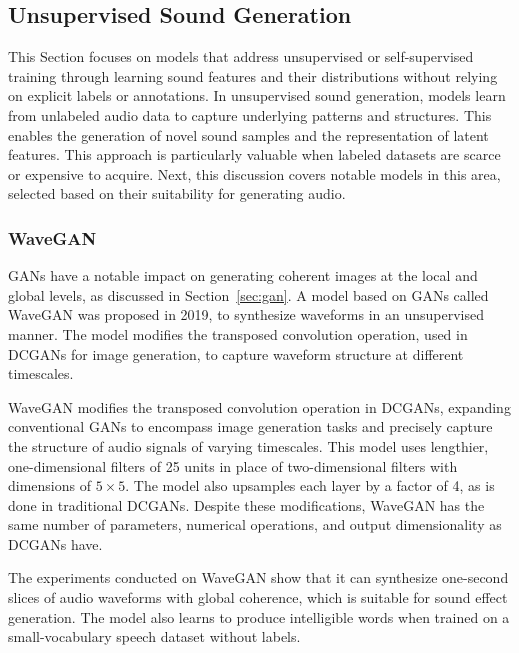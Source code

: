 \subsection{Unsupervised Sound Generation} \label{sec:unsupervised-generation}

This Section focuses on models that address unsupervised or self-supervised training through learning sound features and their distributions without relying on explicit labels or annotations. In unsupervised sound generation, models learn from unlabeled audio data to capture underlying patterns and structures. This enables the generation of novel sound samples and the representation of latent features. This approach is particularly valuable when labeled datasets are scarce or expensive to acquire. Next, this discussion covers notable models in this area, selected based on their suitability for generating audio.

\subsubsection{WaveGAN} \label{sec:wavegan}

\Acp{GAN} have a notable impact on generating coherent images at the local and global levels, as discussed in Section~\ref{sec:gan}. A model based on \acp{GAN} called WaveGAN \cite{donahue_adversarial_2019} was proposed in 2019, to synthesize waveforms in an unsupervised manner. The model modifies the transposed convolution operation, used in \acp{DCGAN} for image generation, to capture waveform structure at different timescales.

WaveGAN modifies the transposed convolution operation in \acp{DCGAN}, expanding conventional \acp{GAN} to encompass image generation tasks and precisely capture the structure of audio signals of varying timescales. This model uses lengthier, one-dimensional filters of 25 units in place of two-dimensional filters with dimensions of $5 \times 5$. The model also upsamples each layer by a factor of 4, as is done in traditional \acp{DCGAN}. Despite these modifications, WaveGAN has the same number of parameters, numerical operations, and output dimensionality as \acp{DCGAN} have.

The experiments conducted on WaveGAN show that it can synthesize one-second slices of audio waveforms with global coherence, which is suitable for sound effect generation. The model also learns to produce intelligible words when trained on a small-vocabulary speech dataset without labels.

